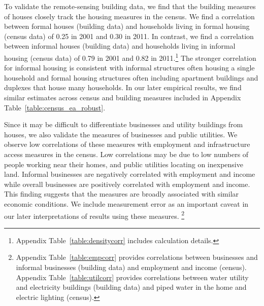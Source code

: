 \documentclass[12pt]{article}
\newcommand{\rv}{}
\begin{document}
\rv{To validate the remote-sensing building data, we find that the building measures of houses closely track the housing measures in the census.  We find a correlation between formal houses (building data) and households living in formal housing (census data) of 0.25 in 2001 and 0.30 in 2011.  In contrast, we find a correlation between informal houses (building data) and households living in informal housing (census data) of 0.79 in 2001 and 0.82 in 2011.}\footnote{\rv{Appendix Table~\ref{table:densitycorr} includes calculation details.}} \rv{  The stronger correlation for informal housing is consistent with informal structures often housing a single household and formal housing structures often including apartment buildings and duplexes that house many households.  In our later empirical results, we find similar estimates across census and building measures included in Appendix Table~\ref{table:census_ea_robust}.  }

\rv{Since it may be difficult to differentiate businesses and utility buildings from houses, we also validate the measures of businesses and public utilities.  We observe low correlations of these measures with employment and infrastructure access measures in the census.  Low correlations may be due to low numbers of people working near their homes, and public utilities locating on inexpensive land.  Informal businesses are negatively correlated with employment and income while overall businesses are positively correlated with employment and income.  This finding suggests that the measures are broadly associated with similar economic conditions.  We include measurement error as an important caveat in our later interpretations of results using these measures. }\footnote{\rv{Appendix Table~\ref{table:empcorr} provides correlations between businesses and informal businesses (building data) and employment and income (census).  Appendix Table~\ref{table:utilcorr} provides correlations between water utility and electricity buildings (building data) and piped water in the home and electric lighting (census).  }}  
\end{document}
